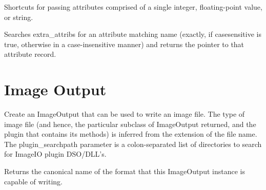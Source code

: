 Shortcuts for passing attributes comprised of a single integer,
floating-point value, or string.
\apiend

Searches {\kw extra_attribs} for an attribute matching {\kw name}
(exactly, if {\kw casesensitive} is true, otherwise in a
case-insensitive manner) and returns the pointer to that attribute
record.
\apiend



\section{Image Output}


Create an {\kw ImageOutput} that can be used to write an image file.
The type of image file (and hence, the particular subclass of {\kw
  ImageOutput} returned, and the plugin that contains its methods) is
inferred from the extension of the file name.  The {\kw
  plugin_searchpath} parameter is a colon-separated list of directories
to search for ImageIO plugin DSO/DLL's.

\apiend

Returns the canonical name of the format that this {\kw ImageOutput}
instance is capable of writing.
\apiend

